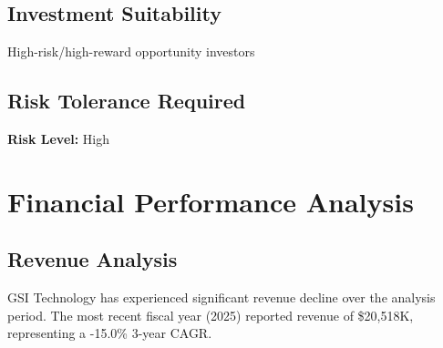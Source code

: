 \documentclass[11pt,a4paper]{article}
\begin{document}
\vspace{0.3cm}

\subsection{Investment Suitability}

\noindent High-risk/high-reward opportunity investors

\vspace{0.3cm}

\subsection{Risk Tolerance Required}

\noindent \textbf{Risk Level:} High


\newpage

\section{Financial Performance Analysis}

\subsection{Revenue Analysis}

GSI Technology has experienced significant revenue decline over the analysis period. The most recent fiscal year (2025) reported revenue of \$20,518K, representing a -15.0\% 3-year CAGR.


\begin{table}[H]
\centering
\caption{Revenue Growth Metrics (Recent 8 Years)}
\label{tab:revenue_growth}
\end{table}
\end{document}
